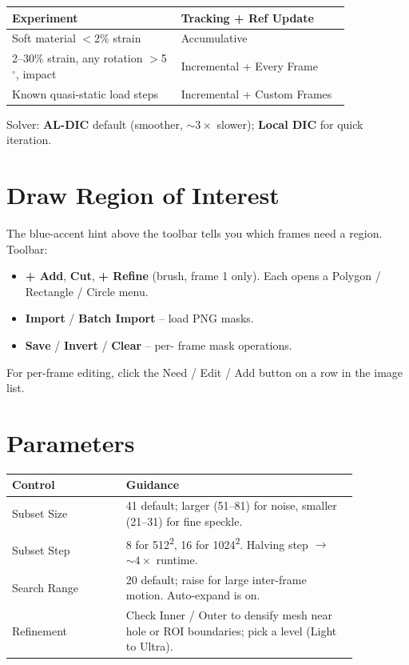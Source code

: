 \documentclass[10pt,letterpaper,twocolumn]{article}
\begin{document}
{\small
\begin{tabular}{@{}p{0.42\linewidth}p{0.42\linewidth}@{}}
  \toprule
  Experiment & Tracking + Ref Update \\
  \midrule
  Soft material $<$2\% strain & Accumulative \\
  2--30\% strain, any rotation $>$5$^\circ$, impact & Incremental + Every Frame \\
  Known quasi-static load steps & Incremental + Custom Frames \\
  \bottomrule
\end{tabular}
}

Solver: \textbf{AL-DIC} default (smoother, $\sim 3\times$ slower);
\textbf{Local DIC} for quick iteration.

\section{Draw Region of Interest}

The blue-accent hint above the toolbar tells you which frames need
a region. Toolbar:

\begin{itemize}
  \item \textbf{+ Add}, \textbf{Cut}, \textbf{+ Refine} (brush,
        frame 1 only). Each opens a Polygon / Rectangle / Circle
        menu.
  \item \textbf{Import} / \textbf{Batch Import} -- load PNG masks.
  \item \textbf{Save} / \textbf{Invert} / \textbf{Clear} -- per-
        frame mask operations.
\end{itemize}

For per-frame editing, click the \textcolor{aldicred}{Need} /
\textcolor{aldicgreen}{Edit} / Add button on a row in the image
list.

\section{Parameters}

{\small
\begin{tabular}{@{}p{0.28\linewidth}p{0.58\linewidth}@{}}
  \toprule
  Control & Guidance \\
  \midrule
  Subset Size & 41 default; larger (51--81) for noise, smaller
                (21--31) for fine speckle. \\
  Subset Step & 8 for 512\textsuperscript{2}, 16 for
                1024\textsuperscript{2}. Halving step $\to$
                $\sim 4\times$ runtime. \\
  Search Range & 20 default; raise for large inter-frame motion.
                 Auto-expand is on. \\
  Refinement & Check Inner / Outer to densify mesh near hole or
               ROI boundaries; pick a level (Light to Ultra). \\
  \bottomrule
\end{tabular}
}
\end{document}
